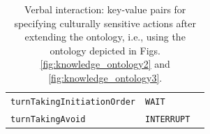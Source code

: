 \documentclass{CSSRforAfrica}
\begin{document}
\begin{table}[H]
\begin{center}
\begin{tabular}{|l l l|}
{\footnotesize \verb+turnTakingInitiationOrder+}            & {\footnotesize \verb+WAIT+} \vspace{-1mm} & {\footnotesize  } \\
{\footnotesize \verb+turnTakingAvoid+}            & {\footnotesize \verb+INTERRUPT+} & {\footnotesize  } \\
\hline \hline
\end{tabular}
\end{center}
\caption{Verbal interaction: key-value pairs for specifying culturally sensitive actions after extending the ontology, i.e., using the ontology depicted in Figs. \ref{fig:knowledge_ontology2} and \ref{fig:knowledge_ontology3}.}
\label{table:key-value_pairs2}
\end{table}
\end{document}
